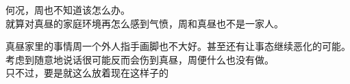 何况，周也不知道该怎么办。\\

就算对真昼的家庭环境再怎么感到气愤，周和真昼也不是一家人。

真昼家里的事情周一个外人指手画脚也不大好。甚至还有让事态继续恶化的可能。考虑到随意地说话很可能反而会伤到真昼，周便什么也没有做。\\

只不过，要是就这么放着现在这样子的























